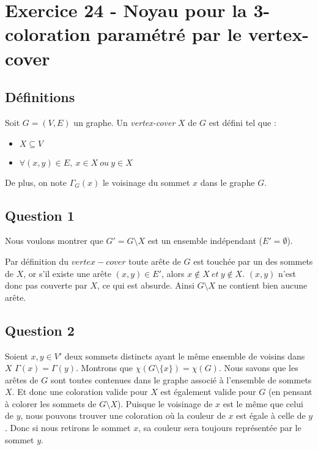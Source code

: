 
\section{Exercice 24 - Noyau pour la 3-coloration paramétré par le vertex-cover}\label{ex16}

\subsection{Définitions}\label{ex24_def}
Soit $G = (V,E)$ un graphe. Un {\em vertex-cover} $X$ de $G$ est défini tel que :
\begin{itemize}
	\item $X \subseteq V$
	\item $\forall (x,y) \in E,\ x \in X\ ou\ y \in X$\\
\end{itemize}
De plus, on note $\Gamma_G(x)$ le voisinage du sommet $x$ dans le graphe
$G$.

\subsection{Question 1}\label{ex24_q1}
Nous voulons montrer que $G' = G \setminus X$ est un ensemble indépendant ($E' =
\emptyset$).

Par définition du $vertex-cover$ toute arête de $G$ est touchée par un des sommets de
$X$, or 
s'il existe une arête $(x,y) \in E'$, alors $x \notin X\ et\ y \notin X$.
$(x,y)$ n'est donc pas couverte par $X$,
ce qui est absurde.
Ainsi $G \setminus X$ ne contient bien aucune arête.

\subsection{Question 2}\label{ex24_q2}
Soient $x,y \in V'$ deux sommets distincts ayant le même ensemble de voisins dans $X$
$\Gamma(x) = \Gamma(y)$.
Montrons que $\chi(G \setminus \{x\}) = \chi(G)$.
Nous savons que les arêtes de $G$ sont toutes contenues dans le graphe associé à
l'ensemble de sommets $X$. Et donc une coloration valide pour $X$ est également valide
pour $G$ (en pensant à colorer les sommets de $G \setminus X$).
Puisque le voisinage de $x$ est le même que celui de $y$, nous pouvons trouver une
coloration où la couleur de $x$ est égale à celle de $y$.
Donc si nous retirons le sommet $x$, sa couleur sera toujours représentée par le
sommet $y$.

